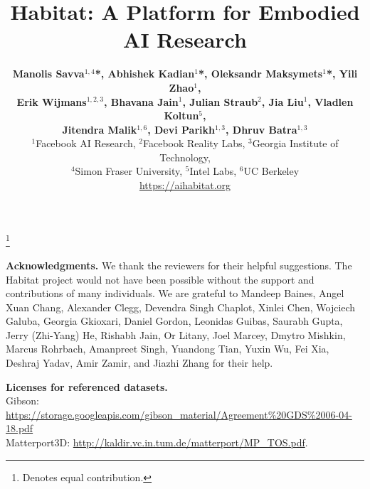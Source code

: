 \documentclass[10pt,twocolumn,letterpaper]{article}
\newcommand{\ourtitle}{Habitat: A Platform for Embodied AI Research\xspace}
\newcommand{\xhdr}[1]{\vspace{2pt}\noindent\textbf{#1}}
\begin{document}
\def\iccvPaperID{4367} %
\def\httilde{\mbox{\tt\raisebox{-.5ex}{\symbol{126}}}}

\ificcvfinal\pagestyle{empty}\fi

\author{
\textbf{Manolis Savva$^{1,4}$*, Abhishek Kadian$^{1}$*, Oleksandr Maksymets$^{1}$*, Yili Zhao$^{1}$,}\\[3pt]
\textbf{Erik Wijmans$^{1,2,3}$, 
Bhavana Jain$^{1}$, Julian Straub$^{2}$, Jia Liu$^{1}$, Vladlen Koltun$^{5}$,}\\[3pt]
\textbf{Jitendra Malik$^{1,6}$, Devi Parikh$^{1,3}$, Dhruv Batra$^{1,3}$}\\[12pt]
$^{1}$Facebook AI Research, $^{2}$Facebook Reality Labs, 
$^{3}$Georgia Institute of Technology,\\
$^{4}$Simon Fraser University, $^{5}$Intel Labs, $^{6}$UC Berkeley\\
\url{https://aihabitat.org}
\vspace{-20pt}
}
\title{\ourtitle}
\maketitle

\let\svthefootnote\thefootnote
\let\thefootnote\relax\footnote{\llap{\textsuperscript{*}}Denotes equal contribution.}
\addtocounter{footnote}{-1}\let\thefootnote\svthefootnote










\vspace{1em}
\xhdr{Acknowledgments.}
We thank the reviewers for their helpful suggestions.
The Habitat project would not have been possible without the support and contributions of many individuals.
We are grateful to Mandeep Baines, Angel Xuan Chang, Alexander Clegg, Devendra Singh Chaplot, Xinlei Chen, Wojciech Galuba, Georgia Gkioxari, Daniel Gordon, Leonidas Guibas, Saurabh Gupta, Jerry (Zhi-Yang) He, Rishabh Jain, Or Litany, Joel Marcey, Dmytro Mishkin, Marcus Rohrbach, Amanpreet Singh, Yuandong Tian, Yuxin Wu, Fei Xia, Deshraj Yadav, Amir Zamir, and Jiazhi Zhang for their help.

\vspace{1em}
\xhdr{Licenses for referenced datasets.}
\\
{%
Gibson: \url{https://storage.googleapis.com/gibson_material/Agreement%20GDS%2006-04-18.pdf}
\\
Matterport3D: \url{http://kaldir.vc.in.tum.de/matterport/MP_TOS.pdf}.
}

\newpage
\balance

{\small


}

\newpage
\appendix

\end{document}
